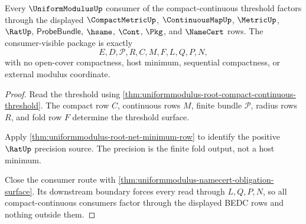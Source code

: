\begin{theorem}
\label{thm:uniformmodulus-root-consumer-package}
Every $\UniformModulusUp$ consumer of the compact-continuous threshold factors
through the displayed $\CompactMetricUp$, $\ContinuousMapUp$, $\MetricUp$,
$\RatUp$, $\mathsf{ProbeBundle}$, $\hsame$, $\Cont$, $\Pkg$, and $\NameCert$
rows. The consumer-visible package is exactly
$$
E,D,\mathcal{P},R,C,M,F,L,Q,P,N,
$$
with no open-cover compactness, host minimum, sequential compactness, or
external modulus coordinate.
\end{theorem}
\begin{proof}
Read the threshold using
\autoref{thm:uniformmodulus-root-compact-continuous-threshold}. The compact row
$C$, continuous rows $M$, finite bundle $\mathcal{P}$, radius rows $R$, and fold
row $F$ determine the threshold surface.

Apply \autoref{thm:uniformmodulus-root-net-minimum-row} to identify the positive
$\RatUp$ precision source. The precision is the finite fold output, not a host
minimum.

Close the consumer route with
\autoref{thm:uniformmodulus-namecert-obligation-surface}. Its downstream
boundary forces every read through $L,Q,P,N$, so all compact-continuous
consumers factor through the displayed BEDC rows and nothing outside them.
\end{proof}

